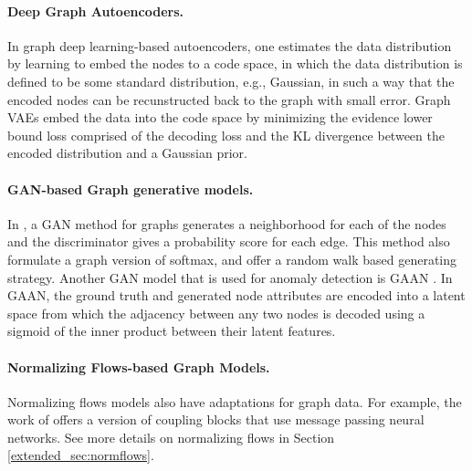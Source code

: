 \documentclass{article}
\theoremstyle{plain}
\theoremstyle{definition}
\theoremstyle{remark}
\newcommand{\ron}[1]{{{\textcolor{red}{\textbf{[Ron:} {#1}\textbf{]}}}}}
\begin{document}

\paragraph{Deep Graph Autoencoders.}
\label{sec:deep graph autoencoders}
In graph deep learning-based autoencoders,  one estimates the data distribution by learning to embed the nodes to a code space, in which the data distribution is defined to be some standard distribution,  e.g., Gaussian, in such a way that the encoded nodes can be recunstructed back to the graph with small error. Graph VAEs \cite{kipf2016variational,grover2019graphite,JMLR:v21:19-671,mehta2019stochastic} embed the data into the code space by minimizing the evidence lower bound loss comprised of the decoding loss and the KL divergence between the encoded distribution and a Gaussian prior. %

\paragraph{GAN-based Graph generative models.}

In  \cite{wang2018graphgan}, a GAN method for graphs generates a neighborhood for each of the nodes and the discriminator gives a probability score for each edge. This method also formulate a graph version of softmax, and offer a random walk based generating strategy. Another GAN model that is used for anomaly detection is GAAN \cite{chen2020gaan}. In GAAN, the ground truth and generated node attributes are encoded into a latent space from which the adjacency between any two nodes is decoded using a sigmoid of the inner product between their latent features. 

\paragraph{Normalizing Flows-based Graph Models.}
Normalizing flows models \cite{dinh2016density}  also have adaptations for graph data. For example, the work of \cite{liu2019graph,madhawa2019graphnvp} offers a version of coupling blocks that use message passing neural networks.  See more details on normalizing flows in Section \ref{extended_sec:normflows}.
\end{document}
